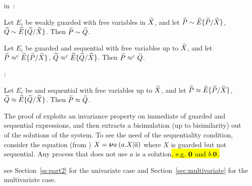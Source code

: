  in~\citep[p.~103, 158]{Mil89}:
\begin{theorem}
\label{t:Mil89s1}
Let $E_i$ be weakly guarded with free variables in $\widetilde X$,
and let ${\widetilde P} \sim {\widetilde E}\{\widetilde P /\widetilde X\}$,
  ${\widetilde Q} \sim {\widetilde E}\{\widetilde Q /\widetilde X\}$. Then ${\widetilde P} \sim {\widetilde Q}$.
\end{theorem}

\begin{theorem}
\label{t:Mil89s3}
Let $E_i$ be guarded and sequential with free
variables up to $\widetilde X$, and let ${\widetilde P} \mathrel{\approx^{\rm{c}}} {\widetilde E}\{\widetilde P /\widetilde X\}$,
  ${\widetilde Q} \mathrel{\approx^{\rm{c}}} {\widetilde E}\{\widetilde Q /\widetilde X\}$. Then ${\widetilde P} \mathrel{\approx^{\rm{c}}} {\widetilde Q}$.
\end{theorem}

:
\begin{theorem}
\label{t:Mil89}
Let $E_i$ be   and sequential with free
variables up to $\widetilde X$, and let ${\widetilde P} \approx {\widetilde E}\{\widetilde P /\widetilde X\}$,
  ${\widetilde Q} \approx {\widetilde E}\{\widetilde Q /\widetilde X\}$. Then ${\widetilde P} \approx {\widetilde Q}$.
\end{theorem}


The proof of  exploits an invariance
property on immediate 
of guarded and sequential expressions, and then extracts a bisimulation
(up to bisimilarity) out
of the solutions of the system.
To see the need of the sequentiality  condition, consider
 the equation (from \cite{Mil89}) $X = {\boldsymbol \nu} a\: (a. X | \overline{a})$
where $X$ is guarded but not sequential. Any process that does not use
$a$ is a solution\hl{, e.g. ${\boldsymbol 0}$ and $b.{\boldsymbol 0}$.}

 see Section~\ref{ss:part2}
for the univariate case and
Section~\ref{sec:multivariate} for the multivariate case.

